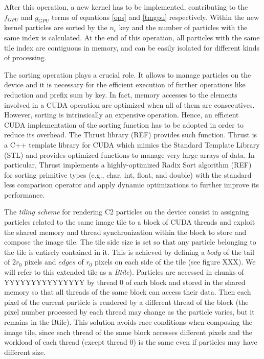\documentclass[11pt]{article}
\begin{document}
After this operation, a new kernel has to be implemented, contributing to the $f_{GPU}$
and $g_{GPU}$ terms of equations \eqref{ops} and \eqref{tmgpu} respectively. 
Within the new kernel particles are sorted by the $n_c$ key and the number 
of particles with the same index is calculated. At the end of this operation, 
all particles with the same tile index are contiguous in memory, and can be easily 
isolated for different kinds of processing. 

The sorting operation plays a crucial role. It allows to manage particles on the 
device and it is necessary for the efficient execution of further operations like 
reduction and prefix sum by key. In fact, memory accesses to the elements involved 
in a CUDA operation are optimized when all of them are consecutives. However, sorting 
is intrinsically an expensive operation. Hence, an efficient CUDA implementation of
the sorting function has to be adopted in order to reduce its overhead. 
The Thrust library (REF) provides such function. Thrust is a C++ template library 
for CUDA which mimics the Standard Template Library (STL) and provides 
optimized functions to manage very large arrays of data. In particular, Thrust 
implements a highly-optimized Radix Sort algorithm (REF) for sorting primitive types
(e.g., char, int, float, and double) with the standard less comparison operator and 
apply dynamic optimizations to further improve its performance.

The \textit{tiling scheme} for rendering C2 particles on the device consist in 
assigning particles related to the same image tile to a block of CUDA threads 
and exploit the shared memory and thread synchronization within the block to store 
and compose the image tile. The tile side size is set so that any particle 
belonging to the tile is entirely contained in it. This is achieved by 
defining a $body$ of the tail of $2r_0$ pixels and $edges$ of $r_0$ pixels on each side 
of the tile (see figure XXX). 
We will refer to this extended tile as a \textit{Btile}).
Particles are accessed in chunks of YYYYYYYYYYYYYYY  by thread 0 of each block and stored 
in the shared memory so that all threads of the same block can access their data. 
Then each pixel of the current particle is rendered by a different thread of 
the block (the pixel number processed by each thread may change as the 
particle varies, but it remains in the Btile). 
This solution avoids race conditions when composing the image tile, since each 
thread of the same block accesses different pixels and the workload of each thread 
(except thread 0) is the same even if particles may have different size.
\end{document}
